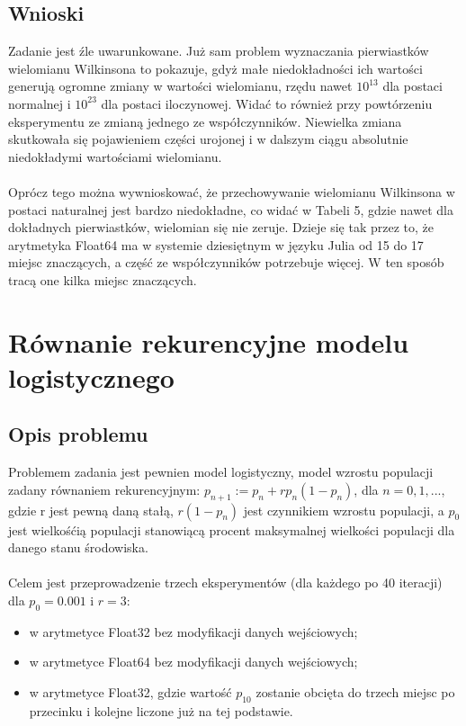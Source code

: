 \documentclass{article}
\begin{document}
\subsection{Wnioski}
Zadanie jest źle uwarunkowane. Już sam problem wyznaczania pierwiastków wielomianu Wilkinsona to pokazuje, gdyż małe niedokładności ich wartości generują ogromne zmiany w wartości wielomianu, rzędu nawet $10^{13}$ dla postaci normalnej i $10^{23}$ dla postaci iloczynowej. Widać to również przy powtórzeniu eksperymentu ze zmianą jednego ze współczynników. Niewielka zmiana skutkowała się pojawieniem części urojonej i w dalszym ciągu absolutnie niedokładymi wartościami wielomianu.
\\  \\ Oprócz tego można wywnioskować, że przechowywanie wielomianu Wilkinsona w postaci naturalnej jest bardzo niedokładne, co widać w Tabeli 5, gdzie nawet dla dokładnych pierwiastków, wielomian się nie zeruje. Dzieje się tak przez to, że arytmetyka Float64 ma w systemie dziesiętnym w języku Julia od 15 do 17 miejsc znaczących, a część ze współczynników potrzebuje więcej. W ten sposób tracą one kilka miejsc znaczących.

\section{Równanie rekurencyjne modelu logistycznego}

\subsection{Opis problemu}
Problemem zadania jest pewnien model logistyczny, model wzrostu populacji zadany równaniem rekurencyjnym: $p_{n+1} := p_n + rp_n(1 - p_n)$, dla $n = 0, 1, ...$, gdzie r jest pewną daną stałą, $r(1 - p_n)$ jest czynnikiem wzrostu populacji, a $p_0$ jest wielkośćią populacji stanowiącą procent maksymalnej wielkości populacji dla danego stanu środowiska. \\ \\ Celem jest przeprowadzenie trzech eksperymentów (dla każdego po 40 iteracji) dla $p_0 = 0.001$ i $r = 3$:
\begin{itemize}
    \item w arytmetyce Float32 bez modyfikacji danych wejściowych;
    \item w arytmetyce Float64 bez modyfikacji danych wejściowych;
    \item w arytmetyce Float32, gdzie wartość $p_{10}$ zostanie obcięta do trzech miejsc po przecinku i kolejne liczone już na tej podstawie.
\end{itemize}
\end{document}
